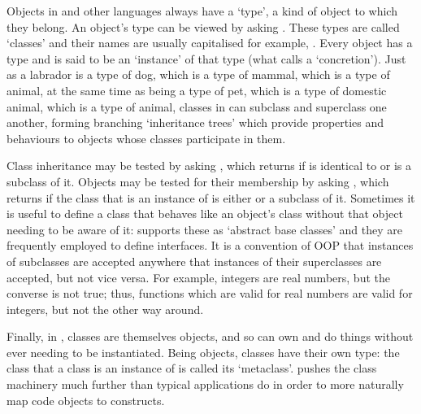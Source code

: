 \documentclass[letterpaper,10pt,english]{jupyterBook}
\begin{document}
\sphinxAtStartPar
Objects in  and other languages always have a ‘type’, a kind of object to which they belong. An object’s type can be viewed by asking . These types are called ‘classes’ and their names are usually capitalised \sphinxhyphen{} for example, . Every object has a type and is said to be an ‘instance’ of that type (what  calls a ‘concretion’). Just as a labrador is a type of dog, which is a type of mammal, which is a type of animal, at the same time as being a type of pet, which is a type of domestic animal, which is a type of animal, classes in  can subclass and superclass one another, forming branching ‘inheritance trees’ which provide properties and behaviours to objects whose classes participate in them.

\sphinxAtStartPar
Class inheritance may be tested by asking , which returns  if  is identical to  or is a subclass of it. Objects may be tested for their membership by asking , which returns  if the class that  is an instance of is either  or a subclass of it. Sometimes it is useful to define a class that behaves like an object’s class without that object needing to be aware of it:  supports these as ‘abstract base classes’ and they are frequently employed to define interfaces. It is a convention of OOP that instances of subclasses are accepted anywhere that instances of their superclasses are accepted, but not vice versa. For example, integers are real numbers, but the converse is not true; thus, functions which are valid for real numbers are valid for integers, but not the other way around.

\sphinxAtStartPar
Finally, in , classes are themselves objects, and so can own and do things without ever needing to be instantiated. Being objects, classes have their own type: the class that a class is an instance of is called its ‘metaclass’.  pushes the  class machinery much further than typical  applications do in order to more naturally map code objects to  constructs.
\end{document}
